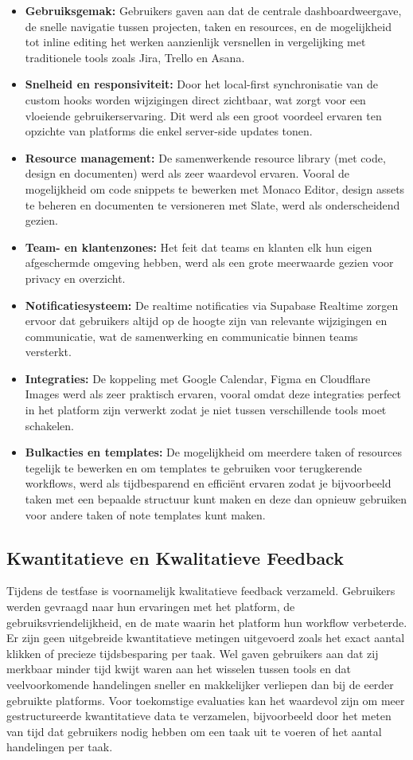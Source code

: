 \begin{itemize}
    \item \textbf{Gebruiksgemak:} Gebruikers gaven aan dat de centrale dashboardweergave, de snelle navigatie tussen projecten, taken en resources, en de mogelijkheid tot inline editing het werken aanzienlijk versnellen in vergelijking met traditionele tools zoals Jira, Trello en Asana.
    \item \textbf{Snelheid en responsiviteit:} Door het local-first synchronisatie van de custom hooks worden wijzigingen direct zichtbaar, wat zorgt voor een vloeiende gebruikerservaring. Dit werd als een groot voordeel ervaren ten opzichte van platforms die enkel server-side updates tonen.
    \item \textbf{Resource management:} De samenwerkende resource library (met code, design en documenten) werd als zeer waardevol ervaren. Vooral de mogelijkheid om code snippets te bewerken met Monaco Editor, design assets te beheren en documenten te versioneren met Slate, werd als onderscheidend gezien.
    \item \textbf{Team- en klantenzones:} Het feit dat teams en klanten elk hun eigen afgeschermde omgeving hebben, werd als een grote meerwaarde gezien voor privacy en overzicht.
    \item \textbf{Notificatiesysteem:} De realtime notificaties via Supabase Realtime zorgen ervoor dat gebruikers altijd op de hoogte zijn van relevante wijzigingen en communicatie, wat de samenwerking en communicatie binnen teams versterkt.
    \item \textbf{Integraties:} De koppeling met Google Calendar, Figma en Cloudflare Images werd als zeer praktisch ervaren, vooral omdat deze integraties perfect in het platform zijn verwerkt zodat je niet tussen verschillende tools moet schakelen.
    \item \textbf{Bulkacties en templates:} De mogelijkheid om meerdere taken of resources tegelijk te bewerken en om templates te gebruiken voor terugkerende workflows, werd als tijdbesparend en efficiënt ervaren zodat je bijvoorbeeld taken met een bepaalde structuur kunt maken en deze dan opnieuw gebruiken voor andere taken of note templates kunt maken.
\end{itemize}

\subsection{Kwantitatieve en Kwalitatieve Feedback}
Tijdens de testfase is voornamelijk kwalitatieve feedback verzameld. Gebruikers werden gevraagd naar hun ervaringen met het platform, de gebruiksvriendelijkheid, en de mate waarin het platform hun workflow verbeterde. Er zijn geen uitgebreide kwantitatieve metingen uitgevoerd zoals het exact aantal klikken of precieze tijdsbesparing per taak. Wel gaven gebruikers aan dat zij merkbaar minder tijd kwijt waren aan het wisselen tussen tools en dat veelvoorkomende handelingen sneller en makkelijker verliepen dan bij de eerder gebruikte platforms. Voor toekomstige evaluaties kan het waardevol zijn om meer gestructureerde kwantitatieve data te verzamelen, bijvoorbeeld door het meten van tijd dat gebruikers nodig hebben om een taak uit te voeren of het aantal handelingen per taak.

